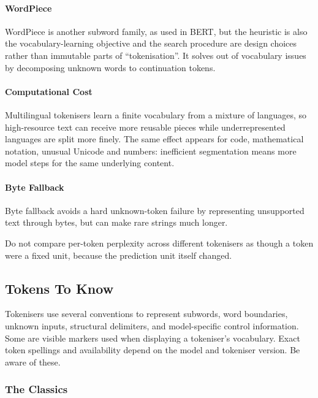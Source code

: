 \paragraph{WordPiece} WordPiece is another subword family, as used in BERT, but the heuristic is also the vocabulary-learning objective and the search procedure are design choices rather than immutable parts of ``tokenisation''.
It solves out of vocabulary issues by decomposing unknown words to continuation tokens.


\paragraph{Computational Cost}
Multilingual tokenisers learn a finite vocabulary from a mixture of languages, so high-resource text can receive more reusable pieces while underrepresented languages are split more finely.
The same effect appears for code, mathematical notation, unusual Unicode and numbers: inefficient segmentation means more model steps for the same underlying content.

\paragraph{Byte Fallback}
Byte fallback avoids a hard unknown-token failure by representing unsupported text through bytes, but can make rare strings much longer.

\begin{calloutpractical}
Do not compare per-token perplexity across different tokenisers as though a token were a fixed unit, because the prediction unit itself changed.
\end{calloutpractical}


\subsection{Tokens To Know}

Tokenisers use several conventions to represent subwords, word boundaries, unknown inputs, structural delimiters, and model-specific control information. 
Some are visible markers used when displaying a tokeniser's vocabulary. 
Exact token spellings and availability depend on the model and tokeniser version.
Be aware of these.

\subsubsection{The Classics}

